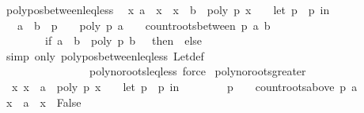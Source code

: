\begin{isabellebody}
\isamarkupfalse%
%
\endisatagproof
{\isafoldproof}%
%
\isadelimproof
\isanewline
%
\endisadelimproof
\isanewline
{}\isamarkupfalse%
\ poly{\isacharunderscore}pos{\isacharunderscore}between{\isacharunderscore}leq{\isacharunderscore}less{\isacharcolon}\isanewline
\ \ {\isachardoublequoteopen}{\isacharparenleft}{\isasymforall}x{\isachardot}\ a\ {\isasymle}\ x\ {\isasymand}\ x\ {\isacharless}\ b\ {\isasymlongrightarrow}\ poly\ p\ x\ {\isachargreater}\ {}{\isacharparenright}\ {\isasymlongleftrightarrow}\ {\isacharparenleft}let\ p\ {\isacharequal}\ p\ in\isanewline
\ \ \ {\isacharparenleft}a\ {\isasymge}\ b\ {\isasymor}\ {\isacharparenleft}p\ {\isasymnoteq}\ {}\ {\isasymand}\ poly\ p\ a\ {\isachargreater}\ {}\ {\isasymand}\ count{\isacharunderscore}roots{\isacharunderscore}between\ p\ a\ b\ {\isacharequal}\ \isanewline
\ \ \ \ \ \ \ \ {\isacharparenleft}if\ a\ {\isacharless}\ b\ {\isasymand}\ poly\ p\ b\ {\isacharequal}\ {}\ then\ {}\ else\ {}{\isacharparenright}{\isacharparenright}{\isacharparenright}{\isacharparenright}{\isachardoublequoteclose}\isanewline
%
\isadelimproof
\ %
\endisadelimproof
%
\isatagproof
{}\isamarkupfalse%
\ {\isacharparenleft}simp\ only{\isacharcolon}\ poly{\isacharunderscore}pos{\isacharunderscore}between{\isacharunderscore}leq{\isacharunderscore}less\ Let{\isacharunderscore}def\ \isanewline
\ \ \ \ \ \ \ \ \ \ \ \ \ \ \ \ poly{\isacharunderscore}no{\isacharunderscore}roots{\isacharunderscore}leq{\isacharunderscore}less{\isacharcomma}\ force{\isacharparenright}%
\endisatagproof
{\isafoldproof}%
%
\isadelimproof
\isanewline
%
\endisadelimproof
\isanewline
\isanewline
{}\isamarkupfalse%
\ poly{\isacharunderscore}no{\isacharunderscore}roots{\isacharunderscore}greater{\isacharcolon}\isanewline
\ \ {\isachardoublequoteopen}{\isacharparenleft}{\isasymforall}x{\isachardot}\ x\ {\isachargreater}\ a\ {\isasymlongrightarrow}\ poly\ p\ x\ {\isasymnoteq}\ {}{\isacharparenright}\ {\isasymlongleftrightarrow}\ {\isacharparenleft}let\ p\ {\isacharequal}\ p\ in\ \isanewline
\ \ \ \ \ \ \ {\isacharparenleft}p\ {\isasymnoteq}\ {}\ {\isasymand}\ count{\isacharunderscore}roots{\isacharunderscore}above\ p\ a\ {\isacharequal}\ {}{\isacharparenright}{\isacharparenright}{\isachardoublequoteclose}\isanewline
%
\isadelimproof
%
\endisadelimproof
%
\isatagproof
{}\isamarkupfalse%
{\isacharminus}\isanewline
\ \ \isamarkupfalse%
\ {\isachardoublequoteopen}{\isasymforall}x{\isachardot}\ {\isasymnot}\ a\ {\isacharless}\ x\ {\isasymLongrightarrow}\ False{\isachardoublequoteclose}\ \isamarkupfalse%

\end{isabellebody}
